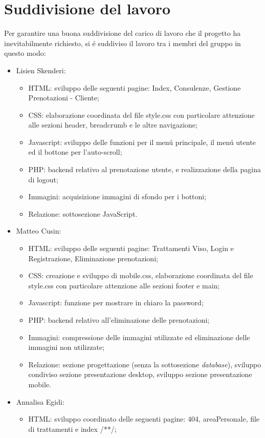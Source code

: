 \documentclass[]{article}
\begin{document}
\section{Suddivisione del lavoro}
Per garantire una buona suddivisione del carico di lavoro che il progetto ha inevitabilmente richiesto, si é suddiviso il lavoro tra i membri del gruppo in questo modo:
\begin{itemize}
	\item Lisien Skenderi: 
	\begin{itemize}
		\item HTML: sviluppo delle seguenti pagine: Index, Consulenze, Gestione Prenotazioni - Cliente;
		\item CSS:  elaborazione coordinata del file style.css con particolare attenzione alle sezioni header, breadcrumb e le altre navigazione;
		\item Javascript: sviluppo delle funzioni per il menú principale, il menú utente ed il bottone per l'auto-scroll;
		\item PHP: backend relativo al prenotazione utente, e realizzazione della pagina di logout;
		\item Immagini: acquisizione immagini di sfondo per i bottoni;
		\item Relazione: sottosezione JavaScript.
	\end{itemize}
	\item Matteo Cusin:
	\begin{itemize}
		\item HTML: sviluppo delle seguenti pagine: Trattamenti Viso, Login e Registrazione, Eliminazione prenotazioni;
		\item CSS: creazione e sviluppo di mobile.css, elaborazione coordinata del file style.css con particolare attenzione alle sezioni footer e main;
		\item Javascript: funzione per mostrare in chiaro la password;
		\item PHP: backend relativo all'eliminazione delle prenotazioni;
		\item Immagini: compressione delle immagini utilizzate ed eliminazione delle immagini non utilizzate;
		\item Relazione: sezione progettazione (senza la sottosezione \textit{database}), sviluppo condiviso sezione presentazione desktop, sviluppo sezione presentazione mobile.
	\end{itemize} 
	\item Annalisa Egidi:
	\begin{itemize}
		\item HTML: sviluppo coordinato delle seguenti pagine: 404, areaPersonale, file di trattamenti e index /**/;

\end{itemize}
\end{itemize}
\end{document}
